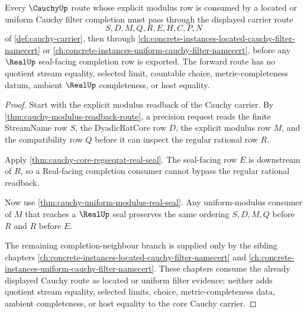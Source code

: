 \begin{theorem}
\label{thm:cauchy-located-uniform-filter-forward-route}
Every $\CauchyUp$ route whose explicit modulus row is consumed by a located or uniform Cauchy filter completion must pass through the displayed carrier route
$$
S,D,M,Q,R,E,H,C,P,N
$$
of \autoref{def:cauchy-carrier}, then through \autoref{ch:concrete-instances-located-cauchy-filter-namecert} or \autoref{ch:concrete-instances-uniform-cauchy-filter-namecert}, before any $\RealUp$ seal-facing completion row is exported. The forward route has no quotient stream equality, selected limit, countable choice, metric-completeness datum, ambient $\RealUp$ completeness, or host equality.
\end{theorem}
\begin{proof}
Start with the explicit modulus readback of the Cauchy carrier. By \autoref{thm:cauchy-modulus-readback-route}, a precision request reads the finite StreamName row $S$, the DyadicRatCore row $D$, the explicit modulus row $M$, and the compatibility row $Q$ before it can inspect the regular rational row $R$.

Apply \autoref{thm:cauchy-core-regseqrat-real-seal}. The seal-facing row $E$ is downstream of $R$, so a Real-facing completion consumer cannot bypass the regular rational readback.

Now use \autoref{thm:cauchy-uniform-modulus-real-seal}. Any uniform-modulus consumer of $M$ that reaches a $\RealUp$ seal preserves the same ordering $S,D,M,Q$ before $R$ and $R$ before $E$.

The remaining completion-neighbour branch is supplied only by the sibling chapters \autoref{ch:concrete-instances-located-cauchy-filter-namecert} and \autoref{ch:concrete-instances-uniform-cauchy-filter-namecert}. These chapters consume the already displayed Cauchy route as located or uniform filter evidence; neither adds quotient stream equality, selected limits, choice, metric-completeness data, ambient completeness, or host equality to the core Cauchy carrier.
\end{proof}
